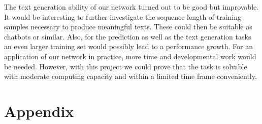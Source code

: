 \documentclass[11pt,a4paper,bibliography=totocnumbered,listof=totocnumbered]{scrartcl}
\begin{document}
The text generation ability of our network turned out to be good but improvable. It would be interesting to further investigate the sequence length of training samples necessary to produce meaningful texts. These could then be suitable as chatbots or similar. Also, for the prediction as well as the text generation tasks an even larger training set would possibly lead to a performance growth. For an application of our network in practice, more time and developmental work would be needed. However, with this project we could prove that the task is solvable with moderate computing capacity and within a limited time frame conveniently. 

\pagebreak
\section{Appendix}
\end{document}
